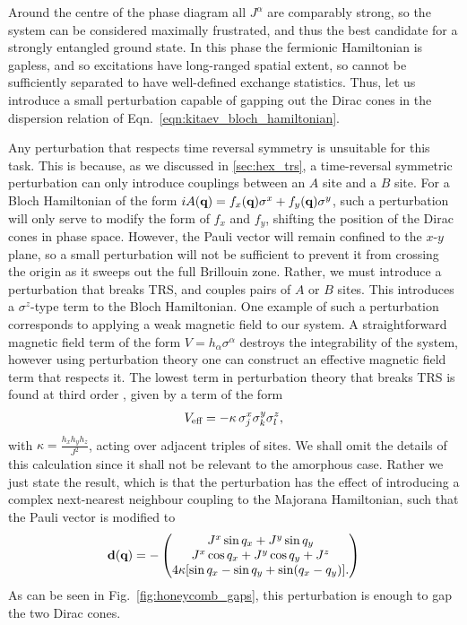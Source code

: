 Around the centre of the phase diagram all $J^\alpha$ are comparably strong, so the system can be considered maximally frustrated, and thus the best candidate for a strongly entangled ground state. In this phase the fermionic Hamiltonian is gapless, and so excitations have long-ranged spatial extent, so cannot be sufficiently separated to have well-defined exchange statistics. Thus, let us introduce a small perturbation capable of gapping out the Dirac cones in the dispersion relation of Eqn.~\ref{eqn:kitaev_bloch_hamiltonian}. 

Any perturbation that respects time reversal symmetry is unsuitable for this task. This is because, as we discussed in \textsection\ref{sec:hex_trs}, a time-reversal symmetric perturbation can only introduce couplings between an $A$ site and a $B$ site. For a Bloch Hamiltonian of the form $iA(\textbf q) = f_x (\textbf q) \sigma^x + f_y (\textbf q) \sigma^y$, such a perturbation will only serve to modify the form of $f_x$ and $f_y$, shifting the position of the Dirac cones in phase space. However, the Pauli vector will remain confined to the $x$-$y$ plane, so a small perturbation will not be sufficient to prevent it from crossing the origin as it sweeps out the full Brillouin zone. Rather, we must introduce a perturbation that breaks TRS, and couples pairs of $A$ or $B$ sites. This introduces a $\sigma^z$-type term to the Bloch Hamiltonian. One example of such a perturbation corresponds to applying a weak magnetic field to our system. A straightforward magnetic field term of the form $V = h_\alpha \sigma^\alpha$ destroys the integrability of the system, however using perturbation theory one can construct an effective magnetic field term that respects it. The lowest term in perturbation theory that breaks TRS is found at third order \cite{kitaev_anyons_2006}, given by a term of the form
\begin{align}
    V_{\textup{eff}} = - \kappa\, 
    \sigma_j^x
    \sigma_k^y
    \sigma_l^z,
\end{align}
with $\kappa = \frac{h_xh_yh_z}{J^2} $, acting over adjacent triples of sites. We shall omit the details of this calculation since it shall not be relevant to the amorphous case. Rather we just state the result, which is that the perturbation has the effect of introducing a complex next-nearest neighbour coupling to the Majorana Hamiltonian, such that the Pauli vector is modified to
 \begin{align}\label{eqn:d_shifted}
    \textbf{d}(\textbf q) = -\begin{pmatrix}
        J^x \sin q_x +J^y \sin q_y \\
        J^x \cos q_x + J^y \cos q_y + J^z \\ 
        4\kappa[\sin q_x - \sin q_y + \sin(q_x - q_y)].
    \end{pmatrix}
\end{align}
As can be seen in Fig.~\ref{fig:honeycomb_gaps}, this perturbation is enough to gap the two Dirac cones.



